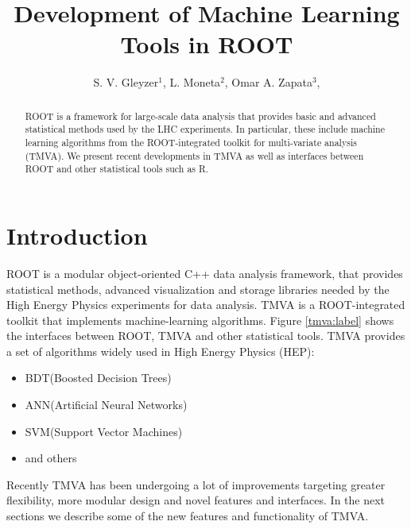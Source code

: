 \documentclass[a4paper]{jpconf}
\begin{document}
\title{Development of Machine Learning Tools in ROOT}



\author{S. V. Gleyzer$^1$, L. Moneta$^2$, Omar A. Zapata$^3$, }



\address{$^1$ University of Florida}

\address{$^2$ CERN}

\address{$^3$ University of Antioquia and Metropolitan Institute of Technology}





\begin{abstract}
ROOT is a framework for large-scale data analysis that provides basic and advanced statistical methods used by the LHC experiments. In particular, these include machine learning algorithms from the ROOT-integrated toolkit for multi-variate analysis (TMVA). We present recent developments in TMVA as well as interfaces between ROOT and other statistical tools such as R.
\end{abstract}



\section{Introduction}
ROOT is a modular object-oriented C++ data analysis framework\cite{Antcheva20092499}, 
that provides statistical methods, advanced visualization and storage libraries 
needed by the High Energy Physics experiments for data analysis. TMVA is a ROOT-integrated toolkit that implements machine-learning algorithms\cite{Hocker:2007ht}. Figure \ref{tmva:label} shows the interfaces between ROOT, TMVA and other statistical tools. TMVA provides a set of algorithms widely used in High Energy Physics (HEP):

\begin{itemize}  

\item BDT(Boosted Decision Trees)

\item ANN(Artificial Neural Networks)

\item SVM(Support Vector Machines)

\item and others

\end{itemize}
Recently TMVA has  been undergoing a lot of improvements targeting  greater flexibility, more modular design and novel features and interfaces. In the next sections we describe some of the new features and functionality of TMVA.
\end{document}
